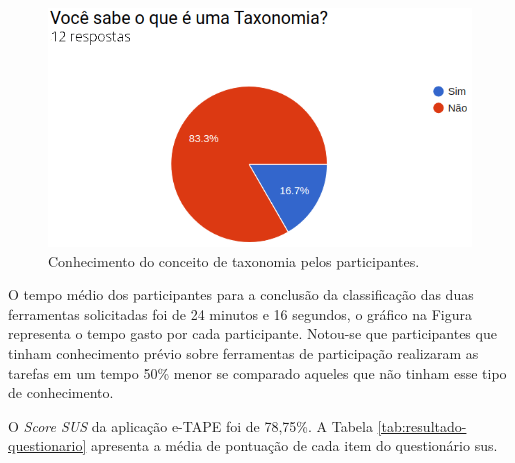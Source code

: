 \begin{figure}[!ht]
    \centering
    \includegraphics[scale=0.4]{./figuras/sabe_taxonomia.png}
    \caption{Conhecimento do conceito de taxonomia pelos participantes.}
    \label{fig:grafico-conhe-taxonomia}
\end{figure}

\par
O tempo médio dos participantes para a conclusão da classificação das duas ferramentas solicitadas foi de 24 minutos e 16 segundos, o gráfico na Figura \label{fig:grafico-tempo}
representa o tempo gasto por cada participante. Notou-se que participantes que tinham conhecimento prévio sobre ferramentas de participação realizaram 
as tarefas em um tempo 50\% menor se comparado aqueles que não tinham esse tipo de conhecimento.

\par 
O \textit{Score SUS} da aplicação e-TAPE foi de 78,75\%. A Tabela \ref{tab:resultado-questionario} apresenta a média de pontuação de cada item do questionário \acrshort{sus}.

